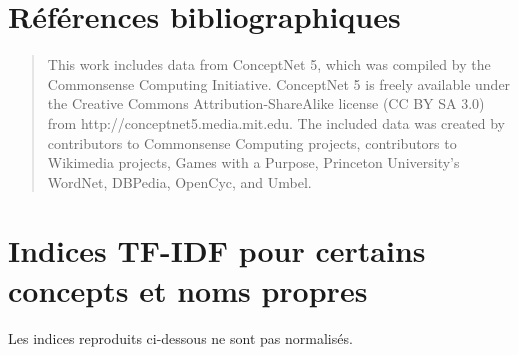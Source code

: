 \documentclass[a4paper, 12pt]{article}
\begin{document}





 

\section{Références bibliographiques}

\begin{quotation}
 This work includes data from ConceptNet 5, which was compiled by the Commonsense Computing Initiative. ConceptNet 5 is freely available under the Creative Commons Attribution-ShareAlike license (CC BY SA 3.0) from http://conceptnet5.media.mit.edu. The included data was created by contributors to Commonsense Computing projects, contributors to Wikimedia projects, Games with a Purpose, Princeton University's WordNet, DBPedia, OpenCyc, and Umbel.
\end{quotation}

\nocite{*}
\printbibliography{}

\newpage
\appendix

\section{Indices TF-IDF pour certains concepts et noms propres}

Les indices reproduits ci-dessous ne sont pas normalisés.
\end{document}
